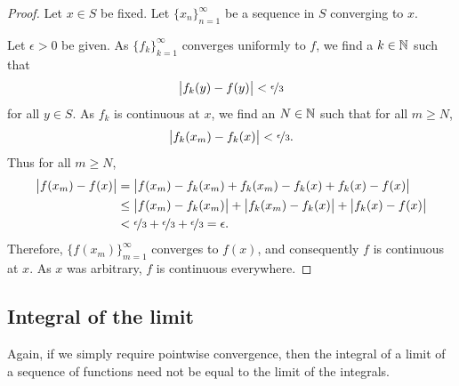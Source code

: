 \begin{proof}
Let $x \in S$ be fixed.  Let $\{ x_n \}_{n=1}^\infty$ be a sequence in $S$
converging to $x$.

Let $\epsilon > 0$ be given.
As $\{ f_k \}_{k=1}^\infty$ converges uniformly to $f$, we find a $k \in {\mathbb{N}}$ such that
\begin{equation*}
\bigl\lvert {f_k(y)-f(y)} \bigr\rvert < \nicefrac{\epsilon}{3}
\end{equation*}
for all $y \in S$.  As $f_k$ is continuous at $x$,
we find an $N \in {\mathbb{N}}$ such that for all $m \geq N$,
\begin{equation*}
\bigl\lvert {f_k(x_m)-f_k(x)} \bigr\rvert < \nicefrac{\epsilon}{3} .
\end{equation*}
Thus for all
$m \geq N$,
\begin{equation*}
\begin{split}
\bigl\lvert {f(x_m)-f(x)} \bigr\rvert
& =
\bigl\lvert {f(x_m)-f_k(x_m)+f_k(x_m)-f_k(x)+f_k(x)-f(x)} \bigr\rvert
\\
& \leq
\bigl\lvert {f(x_m)-f_k(x_m)} \bigr\rvert+
\bigl\lvert {f_k(x_m)-f_k(x)} \bigr\rvert+
\bigl\lvert {f_k(x)-f(x)} \bigr\rvert
\\
& <
\nicefrac{\epsilon}{3} +
\nicefrac{\epsilon}{3} +
\nicefrac{\epsilon}{3} = \epsilon .
\end{split}
\end{equation*}
Therefore, $\bigl\{ f(x_m) \bigr\}_{m=1}^\infty$ converges to $f(x)$,
and consequently $f$ is continuous at $x$.
As $x$ was arbitrary, $f$ is continuous everywhere.
\end{proof}

\subsection{Integral of the limit}

Again, if we simply require pointwise convergence, then the integral
of a limit of a sequence of functions need not be equal to the limit
of the integrals.

